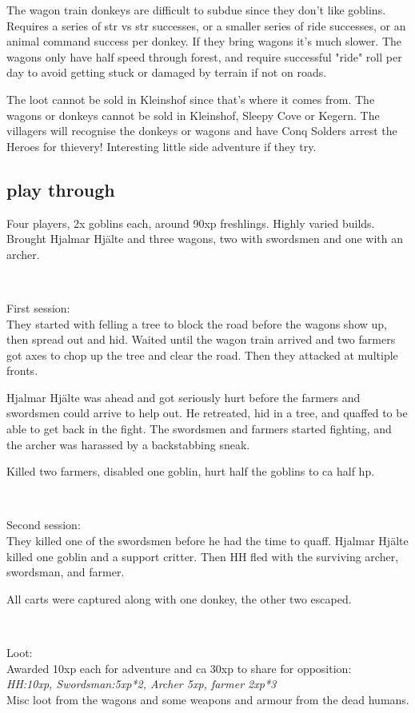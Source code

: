 The wagon train donkeys are difficult to subdue since they don't like goblins. Requires a series of str vs str successes, or a smaller series of ride successes, or an animal command success per donkey. If they bring wagons it's much slower. The wagons only have half speed through forest, and require successful "ride" roll per day to avoid getting stuck or damaged by terrain if not on roads.

The loot cannot be sold in Kleinshof since that's where it comes from. The wagons or donkeys cannot be sold in Kleinshof, Sleepy Cove or Kegern. The villagers will recognise the donkeys or wagons and have Conq Solders arrest the Heroes for thievery! Interesting little side adventure if they try.


\subsection*{play through}

Four players, 2x goblins each, around 90xp freshlings. Highly varied builds.
Brought Hjalmar Hjälte and three wagons, two with swordsmen and one with an archer.

\

First session: \\
They started with felling a tree to block the road before the wagons show up, then spread out and hid. Waited until the wagon train arrived and two farmers got axes to chop up the tree and clear the road. Then they attacked at multiple fronts.

Hjalmar Hjälte was ahead and got seriously hurt before the farmers and swordsmen could arrive to help out. He retreated, hid in a tree, and quaffed to be able to get back in the fight. The swordsmen and farmers started fighting, and the archer was harassed by a backstabbing sneak.

Killed two farmers, disabled one goblin, hurt half the goblins to ca half hp.

\

Second session: \\
They killed one of the swordsmen before he had the time to quaff. Hjalmar Hjälte killed one goblin and a support critter. Then HH fled with the surviving archer, swordsman, and farmer.

All carts were captured along with one donkey, the other two escaped.

\

Loot: \\
Awarded 10xp each for adventure and ca 30xp to share for opposition:\\
\emph{HH:10xp, Swordsman:5xp*2, Archer 5xp, farmer 2xp*3}\\
Misc loot from the wagons and some weapons and armour from the dead humans.

